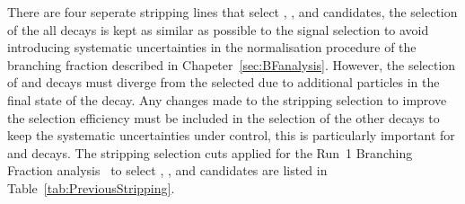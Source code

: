 There are four seperate stripping lines that select \bmumu, \bujpsik, \bsjpisphi and \bhh candidates, the selection of the all decays is kept as similar as possible to the signal selection to avoid introducing systematic uncertainties in the normalisation procedure of the branching fraction described in Chapeter~\ref{sec:BFanalysis}. However, the selection of \bujpsik and \bsjpsiphi decays must diverge from the \bmumu selected due to additional particles in the final state of the decay. Any changes made to the \bmumu stripping selection to improve the selection efficiency must be included in the selection of the other decays to keep the systematic uncertainties under control, this is particularly important for \bhh and \bujpsik decays. %
The stripping selection cuts applied for the Run~1 Branching Fraction analysis~\cite{CMS:2014xfa, Aaij:2013aka} to select \bmumu, \bujpsik, \bsjpisphi and \bhh candidates are listed in Table~\ref{tab:PreviousStripping}.



